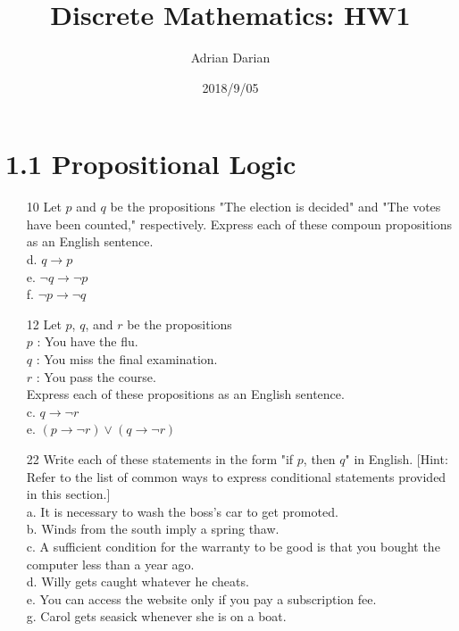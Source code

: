 \documentclass[a4paper]{article}
\title{Discrete Mathematics: HW1}
\author{Adrian Darian}
\date{2018/9/05}
\newcommand\tab[1][0.5cm]{\hspace*{#1}}
\begin{document}
  
  \maketitle
  
  \section*{1.1 Propositional Logic}
  \begin{itemize}
    \item[10] Let $p$ and $q$ be the propositions "The election is decided" and "The votes have been counted," respectively. Express each of these compoun propositions as an English sentence. \\
      d. $q \rightarrow p$ \\
      e. $\neg q \rightarrow \neg p$ \\
      f. $\neg p \rightarrow \neg q$
    \item[12] Let $p$, $q$, and $r$ be the propositions \\
    \tab $p$ : You have the flu. \\
    \tab $q$ : You miss the final examination. \\
    \tab $r$ : You pass the course. \\
    Express each of these propositions as an English sentence. \\
      c. $q \rightarrow \neg r$ \\
      e. $(p \rightarrow \neg r) \lor (q \rightarrow \neg r)$
    \item[22] Write each of these statements in the form "if $p$, then $q$" in English. [Hint: Refer to the list of common ways to express conditional statements provided in this section.] \\
      a. It is necessary to wash the boss's car to get promoted. \\
      b. Winds from the south imply a spring thaw. \\
      c. A sufficient condition for the warranty to be good is that you bought the computer less than a year ago. \\
      d. Willy gets caught whatever he cheats. \\
      e. You can access the website only if you pay a subscription fee. \\
      g. Carol gets seasick whenever she is on a boat.
  \end{itemize}

  
\end{document}
